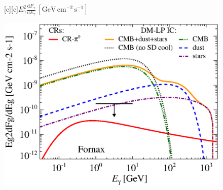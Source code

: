 \documentclass[dvips]{article}
\begin{document}
\pagestyle{empty}

\newcommand{\size}{\Large}%

\begin{figure}
  [c][c]{\size $E_\gamma^2\frac{\mathrm{d}F_\gamma}{\mathrm{d}E_\gamma}\,[\mathrm{GeV}\,\mathrm{cm}^{-2}\,\mathrm{s}^{-1}]$}
  
    \includegraphics[width=\textwidth]{flux.IRcomp.v8.0.1deg.1.6T.SubMass.elmu.SF300.noMW.woGal_raw.eps}
\end{figure}
\end{document}
